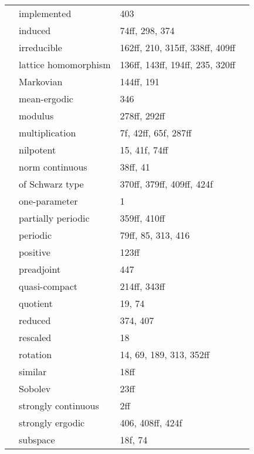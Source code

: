 \documentclass[10pt]{scrartcl}
\begin{document}
\begin{longtable}{>{\bfseries}p{4cm}p{4cm}p{4cm}p{4cm}}
	& implemented 	& 403 \\
	& induced 	& 74ff, 298, 374 \\
	& irreducible 	& 162ff, 210, 315ff, 338ff, 409ff \\
	& lattice homomorphism 	& 136ff, 143ff, 194ff, 235, 320ff \\
	& Markovian 	& 144ff, 191 \\
	& mean-ergodic 	& 346 \\
	& modulus 	& 278ff, 292ff \\
	& multiplication 	& 7f, 42ff, 65f, 287ff \\
	& nilpotent 	& 15, 41f, 74ff \\
	& norm continuous 	& 38ff, 41 \\
	& of Schwarz type 	& 370ff, 379ff, 409ff, 424f \\
	& one-parameter 	& 1 \\
	& partially periodic 	& 359ff, 410ff \\
	& periodic 	& 79ff, 85, 313, 416 \\
	& positive 	& 123ff \\
	& preadjoint 	& 447 \\
	& quasi-compact 	& 214ff, 343ff \\
	& quotient 	& 19, 74 \\
	& reduced 	& 374, 407 \\
	& rescaled 	& 18 \\
	& rotation 	& 14, 69, 189, 313, 352ff \\
	& similar 	& 18ff \\
	& Sobolev 	& 23ff \\
	& strongly continuous 	& 2ff \\
	& strongly ergodic 	& 406, 408ff, 424f \\
	& subspace 	& 18f, 74 \\

\end{longtable}
\end{document}
